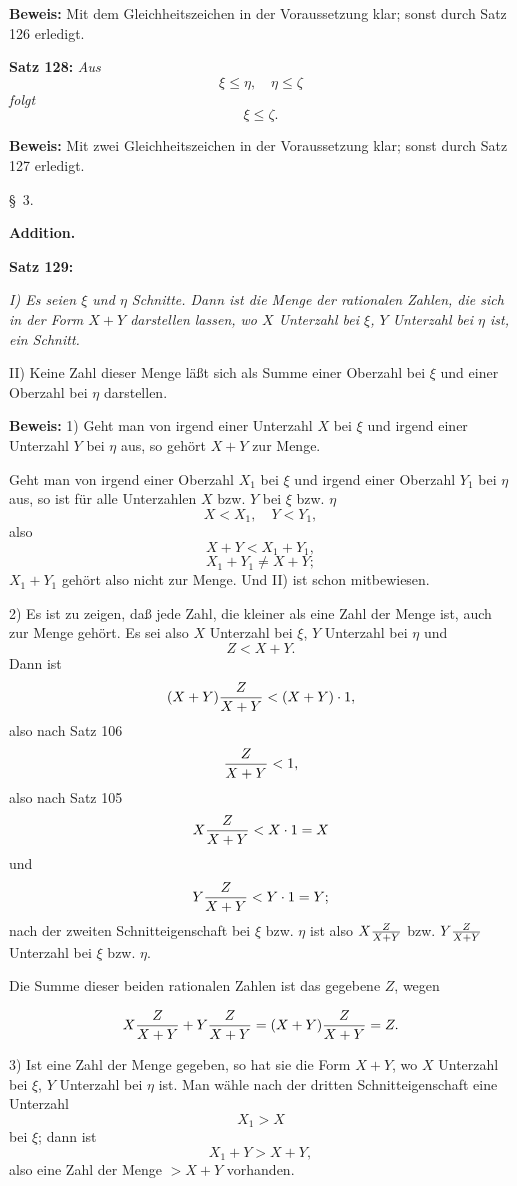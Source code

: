 {\bf Beweis:} Mit dem Gleichheitszeichen in der Voraussetzung klar;
sonst durch Satz 126 erledigt.
\medskip


{\bf Satz 128:} {\it Aus
$$\xi \le \eta,\quad \eta \le \zeta$$
folgt
$$\xi \le \zeta.$$}%

{\bf Beweis:} Mit zwei Gleichheitszeichen in der Voraussetzung
klar; sonst durch Satz 127 erledigt.
\vfill\eject



\line{}\baselineskip
\centerline{{\S}~3.}
\medskip

\centerline{\bf Addition.}
\bigskip

{\bf Satz 129:} {\it {\rm I)} Es seien $\xi$ und $\eta$ Schnitte.  Dann ist die Menge
der rationalen Zahlen, die sich in der Form $X + Y$ darstellen lassen,
wo $X$ Unterzahl bei $\xi$, $Y$ Unterzahl bei $\eta$ ist, ein Schnitt.

{\rm II)} Keine Zahl dieser Menge l\"a{\ss}t sich als Summe einer Oberzahl
bei $\xi$ und einer Oberzahl bei $\eta$ darstellen.}

{\bf Beweis:} 1) Geht man von irgend einer Unterzahl $X$ bei $\xi$ und
irgend einer Unterzahl $Y$ bei $\eta$ aus, so geh\"ort $X+ Y$ zur Menge.

Geht man von irgend einer Oberzahl $X_1$ bei $\xi$ und irgend einer
Oberzahl $Y_1$ bei $\eta$ aus, so ist f\"ur alle Unterzahlen $X$ bzw. $Y$ bei
$\xi$ bzw. $\eta$
$$X < X_1,\quad Y < Y_1,$$
also
$$X + Y < X_1 + Y_1,$$
$$X_1 + Y_1 \ne X + Y;$$
$X_1 + Y_1$ geh\"ort also nicht zur Menge.  Und II) ist schon mitbewiesen.

2) Es ist zu zeigen, da{\ss} jede Zahl, die kleiner als eine Zahl
der Menge ist, auch zur Menge geh\"ort.  Es sei also $X$ Unterzahl
bei $\xi$, $Y$ Unterzahl bei $\eta$ und
$$Z < X + Y.$$
Dann ist
$$(X + Y){Z \over X + Y} < (X + Y) \cdot 1,$$
also nach Satz 106
$${Z \over X + Y} < 1,$$
also nach Satz 105
$$X{Z \over X + Y} < X \cdot 1 = X$$
und
$$Y{Z \over X + Y} < Y \cdot 1 = Y;$$
nach der zweiten Schnitteigenschaft bei $\xi$ bzw. $\eta$ ist also $X{Z \over X + Y}$
bzw. $Y{Z \over X + Y}$ Unterzahl bei $\xi$ bzw. $\eta$.

Die Summe dieser beiden rationalen Zahlen ist das gegebene
$Z$, wegen

$$X{Z \over X + Y} + Y{Z \over X + Y} = (X + Y){Z \over X + Y} = Z.$$

3) Ist eine Zahl der Menge gegeben, so hat sie die Form
$X + Y$, wo $X$ Unterzahl bei $\xi$, $Y$ Unterzahl bei $\eta$ ist.  Man w\"ahle
nach der dritten Schnitteigenschaft eine Unterzahl
$$X_1 > X$$
bei $\xi$; dann ist
$$X_1 + Y > X + Y,$$
also eine Zahl der Menge $> X + Y$ vorhanden.
\medskip

